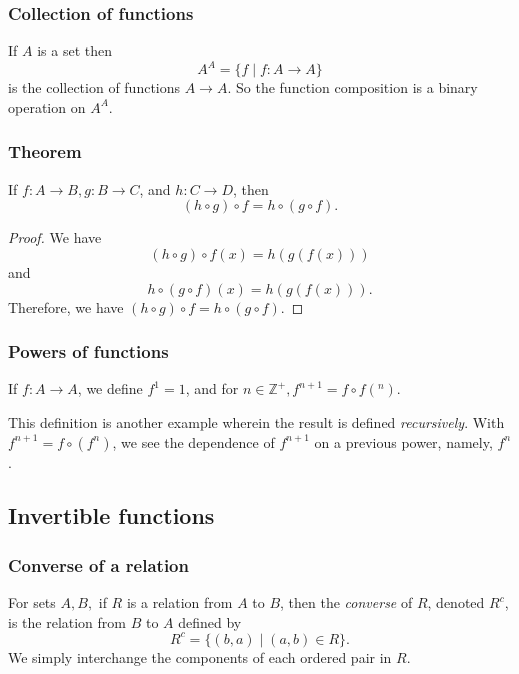 \documentclass[11pt]{article}
\begin{document}
    \subsubsection{Collection of functions}

    If $A$ is a set then \[A^A = \{f \mid f:A \rightarrow A\}\] is the collection of functions \(A \rightarrow A\). So the function composition is a binary operation on $A^A$.

    \subsubsection{Theorem}

    If \(f: A \rightarrow B, g: B \rightarrow C\), and \(h:C \rightarrow D\), then \[ (h \circ g) \circ f = h \circ (g \circ f). \]

    \begin{proof}
        We have \[(h \circ g) \circ f(x) = h(g(f(x)))\] and \[h \circ (g \circ f)(x) = h(g(f(x))).\] Therefore, we have \((h \circ g) \circ f = h \circ (g \circ f).\)
    \end{proof}

    \subsubsection{Powers of functions}

    If \(f:A \rightarrow A\), we define \(f^1 = 1\), and for \(n \in \mathbb{Z}^+, f^{n+1} = f \circ f(^n).\)

    \vspace{1em}

    This definition is another example wherein the result is defined \emph{recursively}. With \(f^{n+1} = f \circ (f^n)\), we see the dependence of \(f^{n+1}\) on a previous power, namely, \(f^n\).

    \subsection{Invertible functions}

    \subsubsection{Converse of a relation}

    For sets \(A,B,\) if $R$ is a relation from $A$ to $B$, then the \emph{converse} of $R$, denoted $R^c$, is the relation from $B$ to $A$ defined by \[R^c = \{(b,a) \mid (a,b) \in R\}.\] We simply interchange the components of each ordered pair in $R$.
\end{document}
